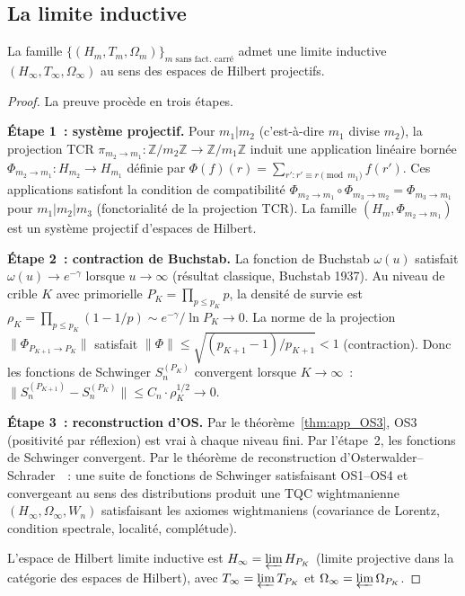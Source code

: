 \documentclass[12pt,a4paper]{article}
\begin{document}
\subsection{La limite inductive}
\label{sec:os_inductive}

\begin{theoreme}
\label{thm:app_inductive}
La famille $\{(H_m, T_m, \Omega_m)\}_{m \text{ sans fact.\ carré}}$
admet une limite inductive $(H_\infty, T_\infty, \Omega_\infty)$
au sens des espaces de Hilbert projectifs.

\begin{proof}
La preuve procède en trois étapes.

\textbf{Étape 1~: système projectif.}
Pour $m_1 | m_2$ (c'est-à-dire $m_1$ divise $m_2$), la projection
TCR
$\pi_{m_2 \to m_1} : \mathbb{Z}/m_2\mathbb{Z} \to
\mathbb{Z}/m_1\mathbb{Z}$ induit une application linéaire bornée
$\Phi_{m_2 \to m_1} : H_{m_2} \to H_{m_1}$ définie par
$\Phi(f)(r) = \sum_{r' : r' \equiv r \pmod{m_1}} f(r')$. Ces
applications satisfont la condition de compatibilité
$\Phi_{m_2 \to m_1} \circ \Phi_{m_3 \to m_2} =
\Phi_{m_3 \to m_1}$ pour $m_1 | m_2 | m_3$ (fonctorialité de la
projection TCR). La famille $(H_m, \Phi_{m_2 \to m_1})$ est un
système projectif d'espaces de Hilbert.

\textbf{Étape 2~: contraction de Buchstab.}
La fonction de Buchstab $\omega(u)$ satisfait
$\omega(u) \to e^{-\gamma}$ lorsque $u \to \infty$ (résultat
classique, Buchstab 1937). Au niveau de crible $K$ avec primorielle
$P_K = \prod_{p \leq p_K} p$, la densité de survie est
$\rho_K = \prod_{p \leq p_K}(1 - 1/p) \sim e^{-\gamma}/\ln P_K
\to 0$. La norme de la projection
$\|\Phi_{P_{K+1} \to P_K}\|$ satisfait
$\|\Phi\| \leq \sqrt{(p_{K+1}-1)/p_{K+1}} < 1$ (contraction).
Donc les fonctions de Schwinger $S_n^{(P_K)}$ convergent lorsque
$K \to \infty$~:
$\|S_n^{(P_{K+1})} - S_n^{(P_K)}\| \leq C_n \cdot \rho_K^{1/2} \to 0$.

\textbf{Étape 3~: reconstruction d'OS.}
Par le théorème~\ref{thm:app_OS3}, OS3 (positivité par réflexion)
est vrai à chaque niveau fini. Par l'étape~2, les fonctions de
Schwinger convergent. Par le théorème de reconstruction
d'Osterwalder--Schrader~\cite{OsterwalderSchrader1973,OsterwalderSchrader1975}~:
une suite de fonctions de Schwinger satisfaisant OS1--OS4 et
convergeant au sens des distributions produit une TQC wightmanienne
$(H_\infty, \Omega_\infty, W_n)$ satisfaisant les axiomes
wightmaniens (covariance de Lorentz, condition spectrale,
localité, complétude).

L'espace de Hilbert limite inductive est
$H_\infty = \varprojlim H_{P_K}$ (limite projective dans la
catégorie des espaces de Hilbert), avec
$T_\infty = \varprojlim T_{P_K}$ et
$\Omega_\infty = \varprojlim \Omega_{P_K}$.
\end{proof}
\end{theoreme}
\end{document}
